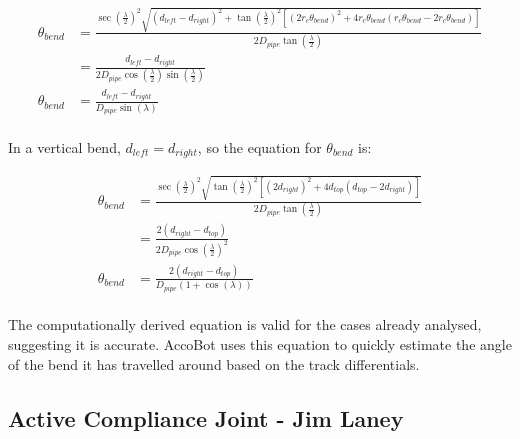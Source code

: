 \documentclass[11pt]{article}		%
\begin{document}
			\begin{align*}
				\theta_{bend} &= \frac{ \sec \left( \frac{\lambda}{2} \right)^2 \sqrt{ \left( d_{left} - d_{right} \right)^2 +  \tan \left( \frac{\lambda}{2} \right)^2 \left[ \left( 2 r_c \theta_{bend} \right)^2 + 4 r_c \theta_{bend} \left( r_c \theta_{bend}  - 2 r_c \theta_{bend} \right) \right] } }{2 D_{pipe} \tan \left( \frac{\lambda}{2} \right)}
				\\
				&= \frac{d_{left} - d_{right}}{2 D_{pipe} \cos \left( \frac{\lambda}{2} \right) \sin \left( \frac{\lambda}{2} \right)}
				\\
				\theta_{bend} &= \frac{d_{left} - d_{right}}{D_{pipe} \sin \left( \lambda \right)}
			\end{align*}
			\\
	        \hspace*{2ex}In a vertical bend, $d_{left} = d_{right}$, so the equation for $\theta_{bend}$ is:
			
			\begin{align*}
				\theta_{bend} &= \frac{ \sec \left( \frac{\lambda}{2} \right)^2 \sqrt{ \tan \left( \frac{\lambda}{2} \right)^2 \left[ \left( 2 d_{right} \right)^2 + 4 d_{top} \left( d_{top} - 2 d_{right} \right) \right] } }{2 D_{pipe} \tan \left( \frac{\lambda}{2} \right)}
				\\
				&= \frac{2 \left( d_{right} - d_{top} \right)}{2 D_{pipe} \cos \left( \frac{\lambda}{2} \right)^2}
				\\
				\theta_{bend} &= \frac{2 \left( d_{right} - d_{top} \right)}{D_{pipe} \left( 1 + \cos \left( \lambda \right) \right)}
			\end{align*}
			\\
	        \hspace*{2ex}The computationally derived equation is valid for the cases already analysed, suggesting it is accurate.
			AccoBot uses this equation to quickly estimate the angle of the bend it has travelled around based on the track differentials.
		 		
		\subsection[Active Compliance Joint]{Active Compliance Joint - Jim Laney} \label{complianceControl}
		
\end{document}
